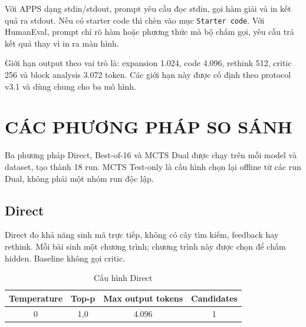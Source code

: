 \begin{center}
\end{center}

Với APPS dạng stdin/stdout, prompt yêu cầu đọc stdin, gọi hàm giải và in kết quả ra stdout. Nếu có starter code thì chèn vào mục \texttt{Starter code}. Với HumanEval, prompt chỉ rõ hàm hoặc phương thức mà bộ chấm gọi, yêu cầu trả kết quả thay vì in ra màn hình.

Giới hạn output theo vai trò là: expansion 1.024, code 4.096, rethink 512, critic 256 và block analysis 3.072 token. Các giới hạn này được cố định theo protocol v3.1 và dùng chung cho ba mô hình.

\section{CÁC PHƯƠNG PHÁP SO SÁNH}
\label{sec:phuongphap}

Ba phương pháp Direct, Best-of-16 và MCTS Dual được chạy trên mỗi model và dataset, tạo thành 18 run. MCTS Test-only là cấu hình chọn lại offline từ các run Dual, không phải một nhóm run độc lập.

\subsection{Direct}
Direct đo khả năng sinh mã trực tiếp, không có cây tìm kiếm, feedback hay rethink. Mỗi bài sinh một chương trình; chương trình này được chọn để chấm hidden. Baseline không gọi critic.

\begin{table}[htbp]
  \caption{Cấu hình Direct}
  \begin{tabular*}{\linewidth}{@{\extracolsep{\fill}}cccc@{}}
    \toprule
    Temperature & Top-p & Max output tokens & Candidates \\
    \midrule
    0 & 1,0 & 4.096 & 1 \\
    \bottomrule
  \end{tabular*}
\end{table}

